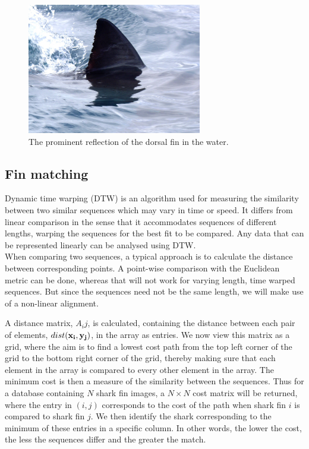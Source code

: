 \documentclass[a4paper,10pt]{article}
\begin{document}
\begin{figure}[H]
 \centering
 \includegraphics[width=3in]{reflectfin.jpg}
 \caption{The prominent reflection of the dorsal fin in the water.}
 \label{shadow}
\end{figure}

\subsection{Fin matching}
Dynamic time warping (DTW) is an algorithm used for
measuring the similarity between two similar sequences which may vary in time or
speed.  It differs from linear comparison in the
sense that it accommodates sequences of different lengths, warping the
sequences for the best fit to be compared.
Any data that can be represented linearly can be analysed using DTW.  \\

When comparing two sequences, a typical approach is to calculate the distance
between corresponding points. A point-wise comparison with the Euclidean
metric can be done, whereas that will not work for varying length, time warped sequences.  But since the sequences
need not be the same length, we will make use of a non-linear
alignment.

A distance matrix, $A_ij$, is calculated, containing the distance between
each pair of elements,  $dist(\bf{x}_i, \bf{y}_j)$, in the array as entries.
We now view this matrix as a
grid, where the
aim is to find a lowest cost path from the top left corner of the grid to the bottom right
corner of the grid, thereby making sure that each element in the array is compared to every other element in the array.
The minimum cost is then a measure of the similarity between the
sequences.  Thus for a database containing $N$ shark fin images, a $N \times N$ cost
matrix will be returned, where the entry in $(i, j)$ corresponds to the cost
of the path when shark fin $i$ is compared to shark fin $j$.  We then identify the shark
corresponding to the minimum of these entries in a specific
column.
In other words, the lower the cost, the less the sequences differ and the greater the match.  \\
\end{document}
